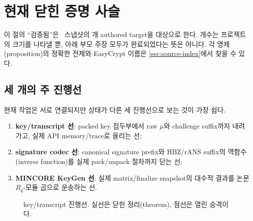 \section{현재 닫힌 증명 사슬}
\label{sec:proved-spine}

이 절의 ``검증됨''은 \SnapshotDate\ 스냅샷의
\AuthoredTargetCount 개 authored target을 대상으로 한다. 개수는 프로젝트의
크기를 나타낼 뿐, 아래 부모 주장 모두가 완료되었다는 뜻은 아니다. 각
명제(proposition)의
정확한 전제와 EasyCrypt 이름은 \cref{sec:source-index}에서 찾을 수 있다.

\subsection{세 개의 주 진행선}

현재 작업은 서로 연결되지만 상태가 다른 세 진행선으로 보는 것이 가장 쉽다.

\begin{enumerate}
  \item \textbf{key/transcript 선}: packed key 접두부에서 raw \(\mu\)와
        challenge suffix까지 내려가고, 실제 API memory/trace로 올리는 선;
  \item \textbf{signature codec 선}: canonical signature prefix와 HBZ/rANS
        suffix의 역함수(inverse function)를 실제 pack/unpack 절차까지 닫는 선;
  \item \textbf{MINCORE KeyGen 선}: 실제 matrix/finalize snapshot의 대수적
        결과를 논문 \(R_q\)-모듈 곱으로 운송하는 선.
\end{enumerate}

\begin{figure}[ht]
\centering
{}
\caption{key/transcript 진행선. 실선은 닫힌 정리(theorem), 점선은 열린 승격이다.}
\label{fig:key-transcript-spine}
\end{figure}


